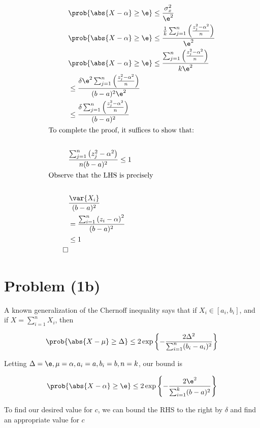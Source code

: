 \documentclass[../main.tex]{subfiles}
\begin{document}
\begin{align*}
    & \prob{\abs{X - \alpha} \geq \e} \leq \frac{\sigma_{x}^2}{\e^2} \\
    & \prob{\abs{X - \alpha} \geq \e} \leq \frac{\frac{1}{k}\sum_{j=1}^{n} \left(\frac{z_{j}^2 - \alpha^2}{n}\right)}{\e^2} \\
    & \prob{\abs{X - \alpha} \geq \e} \leq \frac{\sum_{j=1}^{n} \left(\frac{z_{j}^2 - \alpha^2}{n}\right)}{k \e^2} \\
    &\leq \frac{\delta \e^2 \sum_{j=1}^{n} \left(\frac{z_{j}^2 - \alpha^2}{n}\right)}{(b-a)^2 \e^2} \\
    &\leq \frac{\delta \sum_{j=1}^{n} \left(\frac{z_{j}^2 - \alpha^2}{n}\right)}{(b-a)^2 } \\
    \intertext{To complete the proof, it suffices to show that:} \\
    &\frac{ \sum_{j=1}^{n}\left(z_{j}^2 - \alpha^2\right)}{n(b-a)^2 } \leq 1 \\
    \intertext{Observe that the LHS is precisely} \\
    &\frac{\var{X_{i}}}{(b-a)^2 } \\
    &= \frac{\sum_{i=1}^{n}\left( z_{i} - \alpha \right)^2}{(b-a)^2 } \\
    &\leq 1 \\
    \qed
\end{align*}

\section*{Problem (1b)}

A known generalization of the Chernoff inequality says that if $X_{i} \in [a_{i}, b_{i}]$, and if $X = \sum_{i=1}^{n}X_{i}$, then

\[
    \prob{\abs{X - \mu} \geq \Delta} \leq 2\exp\left\{ -\frac{2 \Delta^2}{\sum_{i=1}^{n}(b_{i}-a_{i})^2}  \right\}
\]

Letting $\Delta = \e, \mu = \alpha, a_{i} = a, b_{i} = b, n = k$, our bound is

\[
    \prob{\abs{X - \alpha} \geq \e} \leq 2\exp\left\{ -\frac{2 \e^2}{\sum_{i=1}^{k}(b-a)^2}  \right\}
\]

To find our desired value for $c$, we can bound the RHS to the right by $\delta$ and find an appropriate value for $c$
\end{document}
